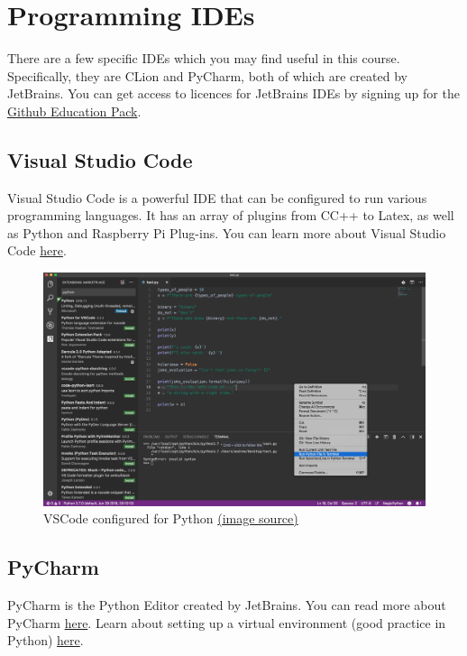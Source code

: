 \section{Programming IDEs}
There are a few specific IDEs which you may find useful in this course. Specifically, they are CLion and PyCharm, both of which are created by JetBrains. You can get access to licences for JetBrains IDEs by signing up for the \href{https://education.github.com/pack}{Github Education Pack}.

\subsection{Visual Studio Code}
Visual Studio Code is a powerful IDE that can be configured to run various programming languages. It has an array of plugins from C\/C++ to Latex, as well as Python and Raspberry Pi Plug-ins. You can learn more about Visual Studio Code \href{https://code.visualstudio.com/}{here}.

\begin{figure}[H]
\centering
\includegraphics[width=0.8\columnwidth]{Figures/VSCode}
\caption{VSCode configured for Python \href{https://stackoverflow.com/questions/51540391/invalid-syntax-error-when-running-python-from-inside-visual-studio-code}{(image source)}}
\label{fig:VSCode}
\end{figure}


\subsection{PyCharm}
PyCharm is the Python Editor created by JetBrains. You can read more about PyCharm \href{https://www.jetbrains.com/help/pycharm/meet-pycharm.html}{here}.
Learn about setting up a virtual environment (good practice in Python) \href{https://www.jetbrains.com/help/pycharm/configuring-python-interpreter.html}{here}.


